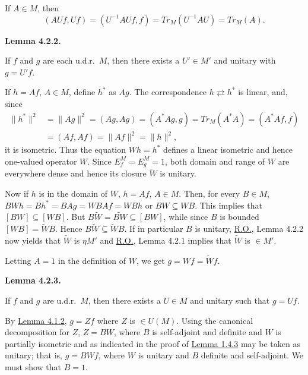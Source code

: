 \documentclass[twoside,leqno]{article}
\newcommand{\Tr}{Tr}
\newcommand{\RO}{\href{https://doi.org/10.2307/1968693}{R.O.}}
\newcommand{\StatementTarget}[1]{\phantomsection\hypertarget{stmt:#1}{}}
\newcommand{\StatementRef}[2]{\hyperlink{stmt:#1}{#2}}
\newenvironment{statement}[2]{%
  \par\medskip
  \noindent\StatementTarget{#1}\hspace*{\parindent}\textbf{#2.}\ \itshape\ignorespaces
}{\par}
\begin{document}
If \(A\in M\), then
\[
 (AUf,Uf)=(U^{-1}AUf,f)=\Tr_M(U^{-1}AU)=\Tr_M(A).
\]

\begin{statement}{lem:4.2.2}{Lemma 4.2.2}
If \(f\) and \(g\) are each u.d.r.\ \(M\), then there exists a
\(U'\in M'\) and unitary with \(g=U'f\).
\end{statement}

If \(h=Af\), \(A\in M\), define \(h^*\) as \(Ag\). The correspondence
\(h\rightleftarrows h^*\) is linear, and, since
\begin{align*}
 \lVert h^*\rVert^2
 &=\lVert Ag\rVert^2=(Ag,Ag)=(A^*Ag,g)=\Tr_M(A^*A)=(A^*Af,f)\\
 &=(Af,Af)=\lVert Af\rVert^2=\lVert h\rVert^2,
\end{align*}
it is isometric. Thus the equation \(Wh=h^*\) defines a linear isometric and
hence one-valued operator \(W\). Since \(E_f^M=E_g^M=1\), both domain and
range of \(W\) are everywhere dense and hence its closure \(\widetilde W\)
is unitary.

Now if \(h\) is in the domain of \(W\), \(h=Af\), \(A\in M\). Then, for every
\(B\in M\),
$BWh=Bh^*=BAg=WBAf=WBh$
or \(BW\subseteq WB\). This implies that \([BW]\subseteq[WB]\). But
\(B\widetilde W=\widetilde{BW}\subseteq[BW]\), while since \(B\) is bounded
\([WB]=\widetilde WB\). Hence \(B\widetilde W\subseteq\widetilde WB\). If in
particular \(B\) is unitary, \RO, Lemma 4.2.2 now yields that
\(\widetilde W\) is \(\eta M'\) and \RO, Lemma 4.2.1 implies that
\(\widetilde W\) is \(\in M'\).

Letting \(A=1\) in the definition of \(W\), we get
\(g=Wf=\widetilde Wf\).

\begin{statement}{lem:4.2.3}{Lemma 4.2.3}
If \(f\) and \(g\) are u.d.r.\ \(M\), then there exists a \(U\in M\) and
unitary such that \(g=Uf\).
\end{statement}

By \StatementRef{lem:4.1.2}{Lemma 4.1.2}, \(g=Zf\) where \(Z\) is
\(\in U(M)\). Using the canonical decomposition for \(Z\), \(Z=BW\), where
\(B\) is self-adjoint and definite and \(W\) is partially isometric and as
indicated in the proof of \StatementRef{lemma:1.4.3}{Lemma 1.4.3} may be taken as unitary; that is,
\(g=BWf\), where \(W\) is unitary and \(B\) definite and self-adjoint. We
must show that \(B=1\).
\end{document}
